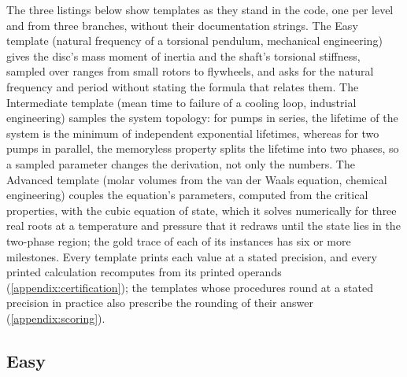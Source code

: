 The three listings below show templates as they stand in the code, one per level and from three
branches, without their documentation strings.
The Easy template (natural frequency of a torsional pendulum, mechanical engineering) gives the
disc's mass moment of inertia and the shaft's torsional stiffness, sampled over ranges from small
rotors to flywheels, and asks for the natural frequency and period without stating the formula that
relates them.
The Intermediate template (mean time to failure of a cooling loop, industrial engineering) samples
the system topology: for pumps in series, the lifetime of the system is the minimum of independent
exponential lifetimes, whereas for two pumps in parallel, the memoryless property splits the
lifetime into two phases, so a sampled parameter changes the derivation, not only the numbers.
The Advanced template (molar volumes from the van der Waals equation, chemical engineering) couples
the equation's parameters, computed from the critical properties, with the cubic equation of state,
which it solves numerically for three real roots at a temperature and pressure that it redraws until
the state lies in the two-phase region; the gold trace of each of its instances has six or more
milestones.
Every template prints each value at a stated precision, and every printed calculation recomputes
from its printed operands (\autoref{appendix:certification}); the templates whose procedures round
at a stated precision in practice also prescribe the rounding of their answer
(\autoref{appendix:scoring}).

\vspace{6pt}

\subsection{Easy}

\vspace{6pt}

